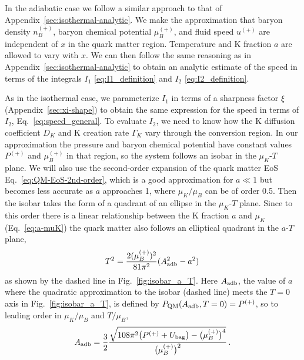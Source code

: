\documentclass[10pt,superscriptaddress,
amsmath,aps,prc,twocolumn,nofootinbib,floatfix]{revtex4-1}
\newcommand{\mga}[1]{{\color[rgb]{0.6,0,0}#1}}
\begin{document}
\mga{In the adiabatic case we follow a similar approach to that of Appendix~\ref{sec:isothermal-analytic}. We make the approximation that baryon density $n_B^{(+)}$,
baryon chemical potential $\mu_B^{(+)}$, and fluid speed $u^{(+)}$ are independent of $x$ in the quark matter region. Temperature and K fraction $a$ are allowed to vary with $x$.  We can then follow the same reasoning as in Appendix~\ref{sec:isothermal-analytic} to obtain an analytic estimate of the speed in terms of the 
integrals $I_1$ \eqref{eq:I1_definition} and $I_2$ \eqref{eq:I2_definition}.}

\mga{As in the isothermal case, we  parameterize $I_1$ in terms of a sharpness factor $\xi$ (Appendix~\ref{sec:xi-shape}) to obtain the same expression for the speed in terms of $I_2$, Eq.~\eqref{eq:speed_general}. }
To evaluate $I_2$, we need to know how the K diffusion coefficient $D_K$ and K creation rate $\Gamma_K$ vary through the conversion region.
In our approximation the pressure and baryon chemical potential have constant values $P^{(+)}$ and $\mu_B^{(+)}$ in that region, so the system follows an isobar in the $\mu_K$-$T$ plane.
\mga{We will also use the second-order expansion of the quark matter EoS Eq.~\eqref{eq:QM-EoS-2nd-order}, which is a good approximation for $a\ll 1$ but becomes less accurate as $a$ approaches 1, where $\mu_K/\mu_B$ can be of order 0.5.}
Then the isobar takes the form of a quadrant of an ellipse in the $\mu_K$-$T$ plane.
Since to this order there is a linear relationship between the K fraction $a$ and $\mu_K$ (Eq.~\eqref{eq:a-muK}) the quark matter also follows an elliptical quadrant in the $a$-$T$ plane, 
%
\begin{equation}
 T^2=\frac{2(\mu_B^{(+)})^2}{81\pi^2}(A_{\rm adb}^2-a^2)\,
\label{eq:constant_pressure_path}
\end{equation}
as shown by the dashed line in Fig.~\ref{fig:isobar_a_T}.
Here $A_{\rm adb}$, the value of $a$
where the quadratic approximation to the isobar (dashed line) meets the $T=0$ axis in Fig.~\ref{fig:isobar_a_T}, is defined by $P_{\text{QM}}(A_{\rm adb},T=0)=P^{(+)}$, so to leading order in $\mu_K/\mu_B$ and $T/\mu_B$,
\begin{equation}
A_{\rm adb} = \dfrac{3}{2}\dfrac{\sqrt{108\pi^2\bigl( P^{(+)}+ U_{\text{bag}} \bigr) - \bigl(\mu_B^{(+)}\bigr)^4}}{\bigl(\mu_B^{(+)}\bigr)^2} \,.
\label{eq:a-max}
\end{equation}
\end{document}
